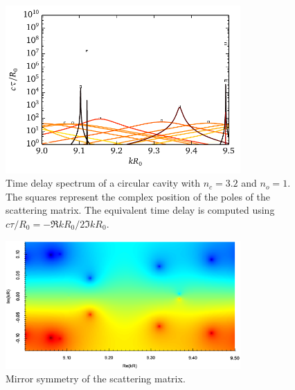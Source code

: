 
\begin{figure}
  \centering
  \includegraphics[width=0.8\textwidth]{figs/passive/correspondanceRootsPeaks.pdf}
  \caption[Correspondance between the poles of the scattering matrix and the peaks
	  of the time delay spectrum.]
	  {Time delay spectrum of a circular cavity with $n_c=3.2$ and $n_o=1$. The squares
	  represent the complex position of the poles of the scattering matrix. The equivalent
	  time delay is computed using $c\tau/R_0=-\Re{kR_0}/2\Im{kR_0}$.}
\end{figure}

\begin{figure}
 \centering
 \includegraphics[width=0.8\textwidth]{figs/passive/determinantSmatrix2D.eps}
 \caption[Mirror symmetry of the scattering matrix]
	 {Mirror symmetry of the scattering matrix.}
\end{figure}



